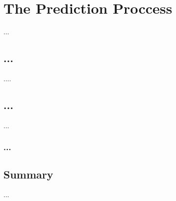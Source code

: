 \chapter{The Prediction Proccess}
\label{prediction-service}

...
\section{...}
....


\section{...}
...


\subsection{...}


\section{Summary}
...


